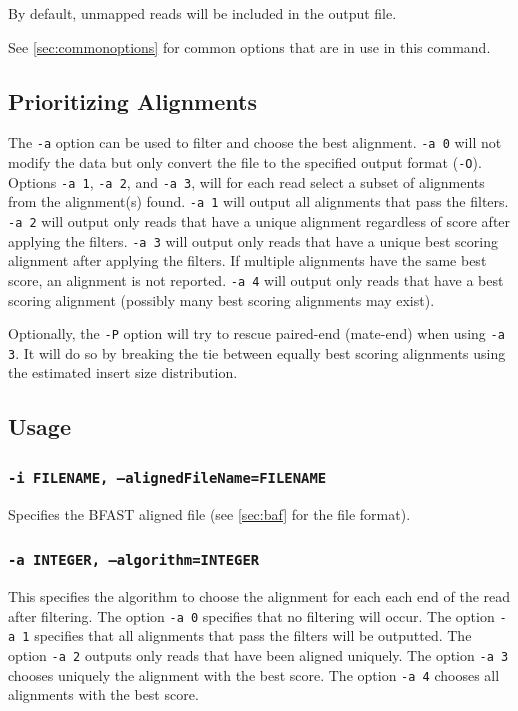 \documentclass[a4paper,12pt]{book}
\newcommand{\TT}[1]{{\tt #1}} %
\newcommand{\BAF}{BFAST aligned file} %
\begin{document}
By default, unmapped reads will be included in the output file.

See \autoref{sec:commonoptions} for common options that are in use in this command.

\subsection{Prioritizing Alignments}
\label{sec:prioritizing-alignments}

The \TT{-a} option can be used to filter and choose the best alignment.
\TT{-a 0} will not modify the data but only convert the file to the specified output format (\TT{-O}).
Options \TT{-a 1}, \TT{-a 2}, and \TT{-a 3}, will for each read select a subset of alignments from the alignment(s) found.
\TT{-a 1} will output all alignments that pass the filters.
\TT{-a 2} will output only reads that have a unique alignment regardless of score after applying the filters.
\TT{-a 3} will output only reads that have a unique best scoring alignment after applying the filters.
If multiple alignments have the same best score, an alignment is not reported.
\TT{-a 4} will output only reads that have a best scoring alignment (possibly many best scoring alignments may exist).

Optionally, the \TT{-P} option will try to rescue paired-end (mate-end) when using \TT{-a 3}.
It will do so by breaking the tie between equally best scoring alignments using the estimated insert size distribution.

\subsection{Usage}
\subsubsection{\TT{-i FILENAME, --alignedFileName=FILENAME}}
Specifies the \BAF{} (see \autoref{sec:baf} for the file format).

\subsubsection{\TT{-a INTEGER, --algorithm=INTEGER}}
This specifies the algorithm to choose the alignment for each each end of the read after filtering.
The option \TT{-a 0} specifies that no filtering will occur.
The option \TT{-a 1} specifies that all alignments that pass the filters will be outputted.
The option \TT{-a 2} outputs only reads that have been aligned uniquely.
The option \TT{-a 3} chooses uniquely the alignment with the best score.
The option \TT{-a 4} chooses all alignments with the best score.
\end{document}
